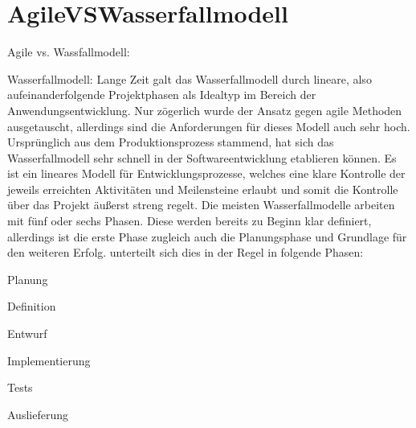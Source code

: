 \section{AgileVSWasserfallmodell}

Agile vs. Wassfallmodell:

Wasserfallmodell:
Lange Zeit galt das Wasserfallmodell durch lineare, also aufeinanderfolgende Projektphasen als Idealtyp im Bereich der Anwendungsentwicklung. Nur zögerlich wurde der Ansatz gegen agile Methoden ausgetauscht, allerdings sind die Anforderungen für dieses Modell auch sehr hoch. Ursprünglich aus dem Produktionsprozess stammend, hat sich das Wasserfallmodell sehr schnell in der Softwareentwicklung etablieren können. Es ist ein lineares Modell für Entwicklungsprozesse, welches eine klare Kontrolle der jeweils erreichten Aktivitäten und Meilensteine erlaubt und somit die Kontrolle über das Projekt äußerst streng regelt. Die meisten Wasserfallmodelle arbeiten mit fünf oder sechs Phasen. Diese werden bereits zu Beginn klar definiert, allerdings ist die erste Phase zugleich auch die Planungsphase und Grundlage für den weiteren Erfolg. unterteilt sich dies in der Regel in folgende Phasen:

Planung

Definition

Entwurf

Implementierung

Tests

Auslieferung

